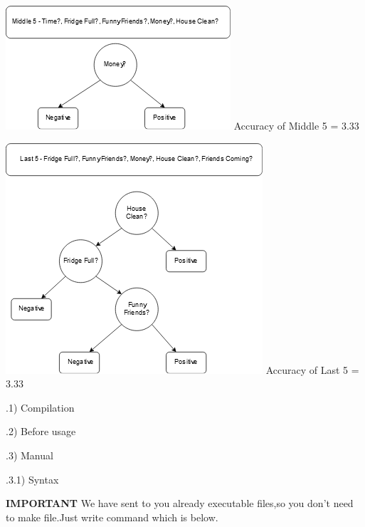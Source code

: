 \documentclass{article}
\begin{document}
\begin{center}
    \includegraphics[scale=1]{Middle.png}
    \newline \newline Accuracy of Middle 5 = 3.33%
\end{center}

\begin{center}
    \includegraphics[scale=1]{Last.png}
    \newline \newline Accuracy of Last 5 = 3.33%
\end{center}

.1) Compilation


.2) Before usage


.3) Manual

.3.1) Syntax

\textbf{IMPORTANT } We have sent to you  already executable files,so you don't need to make file.Just write command which is below.
\end{document}
